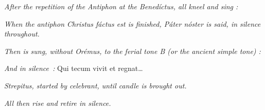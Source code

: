 \bigskip\bigskip
\emph{After the repetition of the Antiphon at the \emph{Benedíctus}, all kneel and sing :}
\medskip
\myrespsize
{
}


\emph{When the antiphon \emph{Christus fáctus est} is finished, \emph{Páter nóster} is said, in silence throughout.}


\emph{Then is sung, without \emph{Orémus}, to the ferial tone \emph{B} (or the ancient simple tone) :}

\bigskip

{
\begin{paracol}{2}
\begin{leftcolumn}%
	\emph{And in silence~:}
	Qui tecum vivit et regnat\dots{}
\end{leftcolumn}
\begin{rightcolumn}%
\end{rightcolumn}
\end{paracol}
}

\bigskip

\emph{Strepitus, started by celebrant, until candle is brought out.}

\emph{All then rise and retire in silence.}

\myantsize
